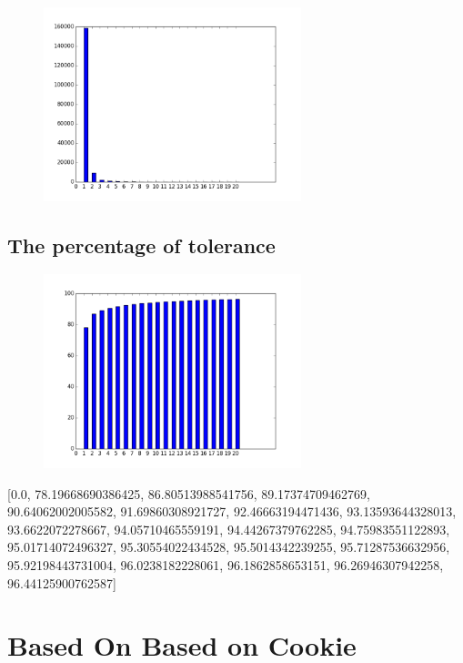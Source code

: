 \documentclass[10pt, conference, compsocconf]{IEEEtran}
\begin{document}
\begin{figure}[H]\centering\includegraphics[width=75mm,scale=0.5]{BasedonClientIDnumberofusersfingerprint}\end{figure}\subsection{The percentage of tolerance}
\begin{figure}[H]\centering\includegraphics[width=75mm,scale=0.5]{BasedonClientIDtolerance}\end{figure}[0.0, 78.19668690386425, 86.80513988541756, 89.17374709462769, 90.64062002005582, 91.69860308921727, 92.46663194471436, 93.13593644328013, 93.6622072278667, 94.05710465559191, 94.44267379762285, 94.75983551122893, 95.01714072496327, 95.30554022434528, 95.5014342239255, 95.71287536632956, 95.92198443731004, 96.0238182228061, 96.1862858653151, 96.26946307942258, 96.44125900762587]\section{Based On Based on Cookie}
\end{document}
